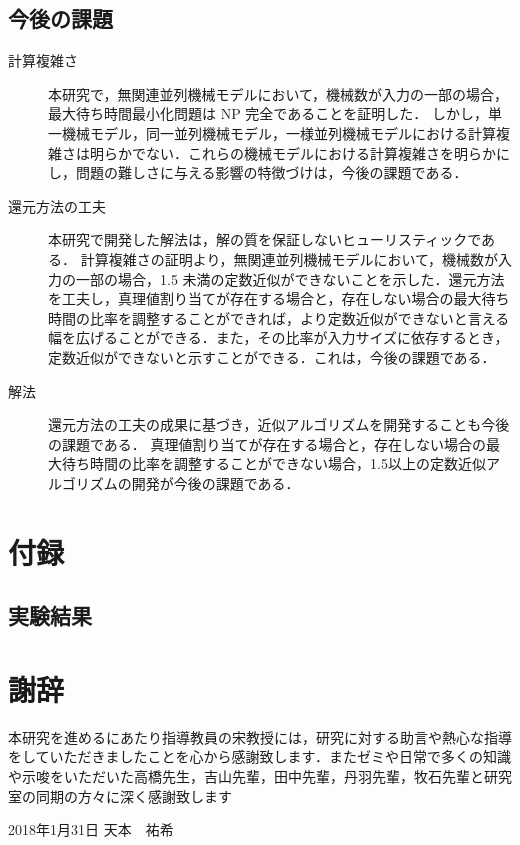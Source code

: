 \documentclass[12pt]{optlab-bachelor}
\def\氏名{天本　祐希}
\begin{document}
\section{今後の課題}
\begin{description}
  \item[計算複雑さ ] 本研究で，無関連並列機械モデルにおいて，機械数が入力の一部の場合，最大待ち時間最小化問題は NP 完全であることを証明した．
  しかし，単一機械モデル，同一並列機械モデル，一様並列機械モデルにおける計算複雑さは明らかでない．これらの機械モデルにおける計算複雑さを明らかにし，問題の難しさに与える影響の特徴づけは，今後の課題である．

  \item[還元方法の工夫 ] 本研究で開発した解法は，解の質を保証しないヒューリスティックである．
  計算複雑さの証明より，無関連並列機械モデルにおいて，機械数が入力の一部の場合，1.5 未満の定数近似ができないことを示した．還元方法を工夫し，真理値割り当てが存在する場合と，存在しない場合の最大待ち時間の比率を調整することができれば，より定数近似ができないと言える幅を広げることができる．また，その比率が入力サイズに依存するとき，定数近似ができないと示すことができる．これは，今後の課題である．

  \item[解法 ]
  還元方法の工夫の成果に基づき，近似アルゴリズムを開発することも今後の課題である．
  真理値割り当てが存在する場合と，存在しない場合の最大待ち時間の比率を調整することができない場合，1.5以上の定数近似アルゴリズムの開発が今後の課題である．

\end{description}

\chapter{付録}\label{c_7}
\section{実験結果}






\chapter*{謝辞}
本研究を進めるにあたり指導教員の宋教授には，研究に対する助言や熱心な指導をしていただきましたことを心から感謝致します．またゼミや日常で多くの知識や示唆をいただいた高橋先生，吉山先輩，田中先輩，丹羽先輩，牧石先輩と研究室の同期の方々に深く感謝致します

\begin{flushright}
  2018年1月31日 \氏名
\end{flushright}
\endmatter
\end{document}
